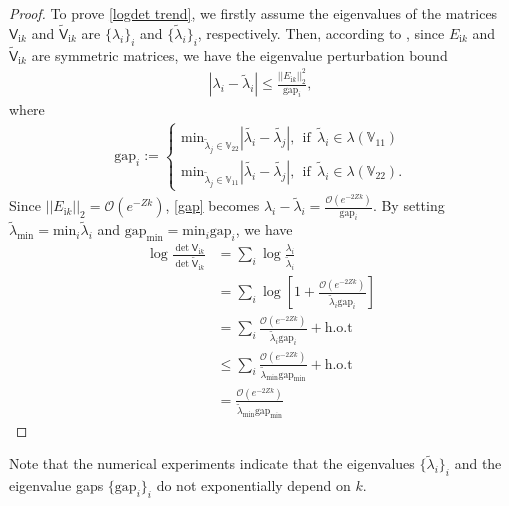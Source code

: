 \begin{proof}
    To prove \eqref{logdet trend}, we firstly assume the eigenvalues of the matrices $\mathsf{V}_{\mathrm{i}k} $ and $\tilde{\mathsf{V}}_{\mathrm{i}k}$
    are  $\{\lambda_{i}\}_{i}$ and $\{\tilde{\lambda}_{i}\}_{i}$, respectively. Then, according to \cite[Theorem 1]{nakatsukasa2015off}, since $E_{\mathrm{i}k}$ and $\tilde{\mathsf{V}}_{\mathrm{i}k}$
    are symmetric matrices, we have the eigenvalue perturbation bound
    \begin{align}\label{gap}
        |\lambda_{i} - \tilde{\lambda}_{i}| \leq \frac{||E_{\mathrm{i}k}||_{2}^{2}}{\text{gap}_{i}},
    \end{align}
    where 
    \begin{align*}
        \text{gap}_{i}:= \begin{cases}
            \text{min}_{\tilde{\lambda}_{j}\in\mathbb{V}_{22}}|\tilde{\lambda_{i}} - \tilde{\lambda_{j}}|, \ \ \text{if}\ \ \tilde{\lambda}_{i} \in \lambda(\mathbb{V}_{11})\\
            \text{min}_{\tilde{\lambda}_{j}\in\mathbb{V}_{11}}|\tilde{\lambda_{i}} - \tilde{\lambda_{j}}|, \ \ \text{if}\ \  \tilde{\lambda}_{i} \in \lambda(\mathbb{V}_{22}).
        \end{cases}
    \end{align*} 
    Since  $||E_{\mathrm{i}k}||_{2} = \mathcal{O}(e^{-Zk})$, \eqref{gap} becomes $\lambda_{i} - \tilde{\lambda}_{i} = \frac{\mathcal{O}(e^{-2Zk})}{\text{gap}_{i}}$.
    By setting $\tilde{\lambda}_{\text{min}} = \text{min}_{i}\tilde{\lambda}_{i}$ and $\text{gap}_{\text{min}} = \text{min}_{i}\text{gap}_{i}$, we have 
    \begin{align*}
        \log\frac{\det\mathsf{V}_{\mathrm{i}k}}{\det\tilde{\mathsf{V}}_{\mathrm{i}k}} &= \sum_{i}\log\frac{\lambda_{i}}{\tilde{\lambda}_{i}}\\
        &= \sum_{i}\log\left[1+\frac{\mathcal{O}(e^{-2Zk})}{\tilde{\lambda}_{i}\text{gap}_{i}}\right]\\
        &= \sum_{i} \frac{\mathcal{O}(e^{-2Zk})}{\tilde{\lambda}_{i}\text{gap}_{i}} + \text{h.o.t}\\
        &\leq \sum_{i}\frac{\mathcal{O}(e^{-2Zk})}{\tilde{\lambda}_{\text{min}}\text{gap}_{\text{min}}} + \text{h.o.t}\\
        &= \frac{\mathcal{O}(e^{-2Zk})}{\tilde{\lambda}_{\text{min}}\text{gap}_{\text{min}}} 
    \end{align*}
\end{proof}
Note that the numerical experiments indicate that the eigenvalues $\{\tilde{\lambda}_{i}\}_{i}$ and the eigenvalue gaps $\{\text{gap}_{i}\}_{i}$ do not exponentially
depend on $k$.


